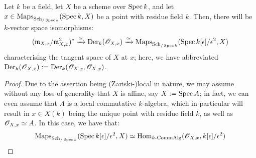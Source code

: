             \begin{lemma} \label{lemma: functorial_characterisation_of_tangent_spaces}
                Let $k$ be a field, let $X$ be a scheme over $\operatorname{Spec} k$, and let $x \in \mathrm{Maps}_{\mathrm{Sch}_{/\operatorname{Spec} k}}(\operatorname{Spec} k, X)$ be a point with residue field $k$. Then, there will be $k$-vector space isomorphisms:
                    $$(\mathfrak{m}_{X, x}/\mathfrak{m}_{X, x}^2)^* \xrightarrow[]{\simeq} \mathrm{Der}_k(\mathscr{O}_{X, x}) \xrightarrow[]{\simeq} \mathrm{Maps}_{\mathrm{Sch}_{/\operatorname{Spec} k}}(\operatorname{Spec} k[\epsilon]/\epsilon^2, X)$$
                characterising the tangent space of $X$ at $x$; here, we have abbreviated $\mathrm{Der}_k(\mathscr{O}_{X, x}) := \mathrm{Der}_k(\mathscr{O}_{X, x}, \mathscr{O}_{X, x})$.
            \end{lemma}
                \begin{proof}
                    Due to the assertion being (Zariski-)local in nature, we may assume without any loss of generality that $X$ is affine, say $X := \operatorname{Spec} A$; in fact, we can even assume that $A$ is a local commutative $k$-algebra, which in particular will result in $x \in X(k)$ being the unique point with residue field $k$, as well as $\mathscr{O}_{X, x} \simeq A$. In this case, we have that:
                        $$\mathrm{Maps}_{\mathrm{Sch}_{/\operatorname{Spec} k}}(\operatorname{Spec} k[\epsilon]/\epsilon^2, X) \simeq \mathrm{Hom}_{k\text{-}\mathrm{Comm}\mathrm{Alg}}(\mathscr{O}_{X, x}, k[\epsilon]/\epsilon^2)$$
                        

\end{proof}
